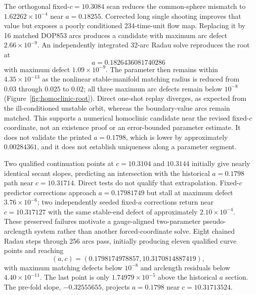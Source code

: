The orthogonal fixed-$c=10.3084$ scan reduces the common-sphere mismatch to
$1.62262\times10^{-4}$ near $a=0.18255$.  Corrected long single shooting
improves that value but exposes a poorly conditioned 234-time-unit flow map.
Replacing it by 16 matched DOP853 arcs produces a candidate with maximum arc
defect $2.66\times10^{-9}$.  An independently integrated 32-arc Radau solve
reproduces the root at
\[
  a=0.1826436081740286
\]
with maximum defect $1.09\times10^{-9}$.  The parameter then remains within
$4.35\times10^{-13}$ as the nonlinear stable-manifold matching radius is
reduced from $0.03$ through $0.025$ to $0.02$; all three maximum arc defects
remain below $10^{-8}$ (Figure~\ref{fig:homoclinic-root}).  Direct one-shot
replay diverges, as expected from the ill-conditioned unstable orbit, whereas
the boundary-value arcs remain matched. This supports a numerical
homoclinic candidate near the revised fixed-$c$ coordinate, not an existence
proof or an error-bounded parameter estimate. It does not
validate the printed $a=0.1798$, which is lower by approximately $0.00284361$,
and it does not establish uniqueness along a parameter segment.

Two qualified continuation points at $c=10.3104$ and $10.3144$ initially
give nearly identical secant slopes, predicting an intersection with the
historical $a=0.1798$ path near $c=10.31714$.  Direct tests do not qualify
that extrapolation.  Fixed-$c$ predictor corrections approach
$a=0.17981749$ but stall at maximum defect $3.76\times10^{-6}$; two
independently seeded fixed-$a$ corrections return near $c=10.317127$ with the
same stable-end defect of approximately $2.10\times10^{-4}$.  These preserved
failures motivate a gauge-aligned two-parameter pseudo-arclength system rather
than another forced-coordinate solve.  Eight chained Radau steps through 256
arcs pass, initially producing eleven qualified curve points and reaching
\[
  (a,c)=(0.1798174978857,10.3170814887419),
\]
with maximum matching defects below $10^{-8}$ and arclength
residuals below $4.40\times10^{-11}$.  The last point is only
$1.74979\times10^{-5}$ above the historical $a$ section.  The pre-fold slope,
$-0.32555655$, projects $a=0.1798$ near $c=10.31713524$.


